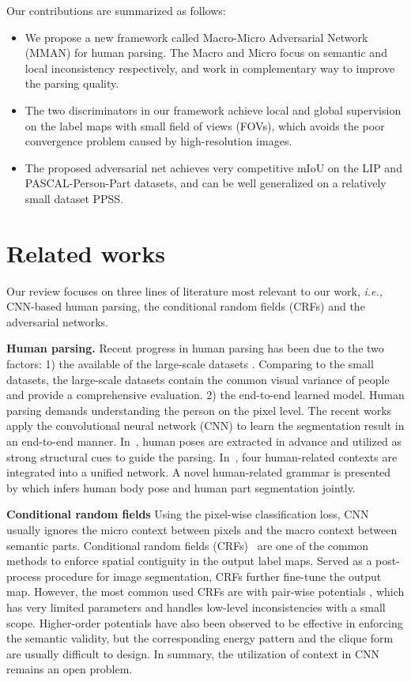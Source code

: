 \documentclass[runningheads]{llncs}
\begin{document}
Our contributions are summarized as follows:
\begin{itemize}
\item We propose a new framework called Macro-Micro Adversarial Network (MMAN) for human parsing. The Macro  and Micro  focus on semantic and local inconsistency respectively, and work in complementary way to improve the parsing quality.

\item The two discriminators in our framework achieve local and global supervision on the label maps with small field of views (FOVs), which avoids the poor convergence problem caused by high-resolution images.

\item The proposed adversarial net achieves very competitive mIoU on the LIP and PASCAL-Person-Part datasets, and can be well generalized on a relatively small dataset PPSS.
\end{itemize}

\section{Related works}
Our review focuses on three lines of literature most relevant to our work, \emph{i.e.,} CNN-based human parsing, the conditional random fields (CRFs) and the adversarial networks.

\textbf{Human parsing.}
Recent progress in human parsing has been due to the two factors: 1) the available of the large-scale datasets \cite{gong2017look,liang2015deep,luo2013pedestrian,chen2014detect}. Comparing to the small datasets, the large-scale datasets contain the common visual variance of people and provide a comprehensive evaluation.
2) the end-to-end learned model. Human parsing demands understanding the person on the pixel level. The recent works apply the convolutional neural network (CNN) to learn the segmentation result in an end-to-end manner. In~\cite{xia2016pose}, human poses are extracted in advance and utilized as strong structural cues to guide the parsing. In~\cite{liang2015human}, four human-related contexts are integrated into a unified network. A novel human-related grammar is presented by \cite{park2017attribute} which infers human body pose and human part segmentation jointly.

\textbf{Conditional random fields}
Using the pixel-wise classification loss, CNN usually ignores the micro context between pixels and the macro context between semantic parts.  Conditional random fields (CRFs)~\cite{krahenbuhl2011efficient,liu2015semantic,li2017holistic} are one of the common methods to enforce spatial contiguity in the output label maps. Served as a post-process procedure for image segmentation, CRFs further fine-tune the output map. However, the most common used CRFs are with pair-wise potentials \cite{chen2016deeplab,luo2016accurate}, which has very limited parameters and handles low-level inconsistencies with a small scope. Higher-order potentials \cite{kohli2009robust,li2017holistic} have also been observed to be effective in enforcing the semantic validity, but the corresponding energy pattern and the clique form are usually difficult to design. In summary, the utilization of context in CNN remains an open problem.
\end{document}
